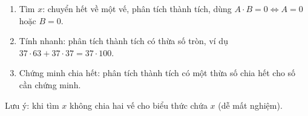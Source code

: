 \begin{enumerate}
\item Tìm $x$: chuyển hết về một vế, phân tích thành tích, dùng $A\cdot B=0\iff A=0$ hoặc $B=0$.
\item Tính nhanh: phân tích thành tích có thừa số tròn, ví dụ $37\cdot 63+37\cdot 37=37\cdot 100$.
\item Chứng minh chia hết: phân tích thành tích có một thừa số chia hết cho số cần chứng minh.
\end{enumerate}
Lưu ý: khi tìm $x$ không chia hai vế cho biểu thức chứa $x$ (dễ mất nghiệm).
